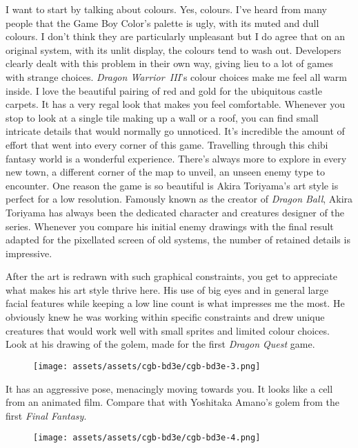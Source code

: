 \documentclass{book}
\begin{document}
I want to start by talking about colours. Yes, colours. I’ve heard from many people that the Game Boy Color’s palette is ugly, with its muted and dull colours. I don’t think they are particularly unpleasant but I do agree that on an original system, with its unlit display, the colours tend to wash out. Developers clearly dealt with this problem in their own way, giving lieu to a lot of games with strange choices. \emph{Dragon Warrior III}’s colour choices make me feel all warm inside. I love the beautiful pairing of red and gold for the ubiquitous castle carpets. It has a very regal look that makes you feel comfortable. Whenever you stop to look at a single tile making up a wall or a roof, you can find small intricate details that would normally go unnoticed. It’s incredible the amount of effort that went into every corner of this game. Travelling through this chibi fantasy world is a wonderful experience. There’s always more to explore in every new town, a different corner of the map to unveil, an unseen enemy type to encounter. One reason the game is so beautiful is Akira Toriyama’s art style is perfect for a low resolution. Famously known as the creator of \emph{Dragon Ball}, Akira Toriyama has always been the dedicated character and creatures designer of the series. Whenever you compare his initial enemy drawings with the final result adapted for the pixellated screen of old systems, the number of retained details is impressive.

After the art is redrawn with such graphical constraints, you get to appreciate what makes his art style thrive here. His use of big eyes and in general large facial features while keeping a low line count is what impresses me the most. He obviously knew he was working within specific constraints and drew unique creatures that would work well with small sprites and limited colour choices. Look at his drawing of the golem, made for the first \emph{Dragon Quest} game.

\begin{figure}[hbt]
\vskip 10pt
\centering \texttt{[image: assets/assets/cgb-bd3e/cgb-bd3e-3.png]}
\vskip 6pt
\end{figure}

It has an aggressive pose, menacingly moving towards you. It looks like a cell from an animated film. Compare that with Yoshitaka Amano’s golem from the first \emph{Final Fantasy}.

\begin{figure}[hbt]
\vskip 10pt
\centering \texttt{[image: assets/assets/cgb-bd3e/cgb-bd3e-4.png]}
\vskip 6pt
\end{figure}
\end{document}
